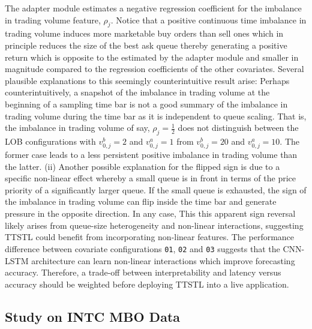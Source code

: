 \documentclass[10pt,a4paper,oneside]{article}
\providecommand{\DIFaddtex}[1]{{\protect\color{blue} \sf #1}} %
\providecommand{\DIFdeltex}[1]{{\protect\color{red} \scriptsize #1}} %
\providecommand{\DIFaddbegin}{} %
\providecommand{\DIFaddend}{} %
\providecommand{\DIFdelbegin}{} %
\providecommand{\DIFdelend}{} %
\providecommand{\DIFadd}[1]{\texorpdfstring{\DIFaddtex{#1}}{#1}} %
\providecommand{\DIFdel}[1]{\texorpdfstring{\DIFdeltex{#1}}{}} %
\newcommand{\DIFscaledelfig}{0.5}
\newlength{\DIFdelgraphicswidth} %
\newlength{\DIFdelgraphicsheight} %
\newcommand{\DIFaddincludegraphics}[2][]{{\color{blue}\fbox{\DIFOincludegraphics[#1]{#2}}}} %
\newcommand{\DIFdelincludegraphics}[2][]{%
\sbox{\DIFdelgraphicsbox}{\DIFOincludegraphics[#1]{#2}}%
\settoboxwidth{\DIFdelgraphicswidth}{\DIFdelgraphicsbox} %
\settoboxtotalheight{\DIFdelgraphicsheight}{\DIFdelgraphicsbox} %
\scalebox{\DIFscaledelfig}{%
\parbox[b]{\DIFdelgraphicswidth}{\usebox{\DIFdelgraphicsbox}\\[-\baselineskip] \rule{\DIFdelgraphicswidth}{0em}}\llap{\resizebox{\DIFdelgraphicswidth}{\DIFdelgraphicsheight}{%
\setlength{\unitlength}{\DIFdelgraphicswidth}%
\begin{picture}(1,1)%
\thicklines\linethickness{2pt} %
{\color[rgb]{1,0,0}\put(0,0){\framebox(1,1){}}}%
{\color[rgb]{1,0,0}\put(0,0){\line( 1,1){1}}}%
{\color[rgb]{1,0,0}\put(0,1){\line(1,-1){1}}}%
\end{picture}%
}\hspace*{3pt}}} %
} %
\DeclareRobustCommand{\DIFaddbegin}{\DIFOaddbegin \let\includegraphics\DIFaddincludegraphics} %
\DeclareRobustCommand{\DIFaddend}{\DIFOaddend \let\includegraphics\DIFOincludegraphics} %
\DeclareRobustCommand{\DIFdelbegin}{\DIFOdelbegin \let\includegraphics\DIFdelincludegraphics} %
\DeclareRobustCommand{\DIFdelend}{\DIFOaddend \let\includegraphics\DIFOincludegraphics} %
\begin{document}
The adapter module estimates a negative regression coefficient for the imbalance in trading volume feature, $\rho_j$. Notice that a positive continuous time imbalance in trading volume induces more marketable buy orders than sell ones which in principle reduces the size of the best ask queue thereby generating a positive return which is opposite to the estimated by the adapter module and smaller in magnitude compared to the regression coefficients of the other covariates. Several plausible explanations to this seemingly counterintuitive result arise: Perhaps counterintuitively, a snapshot of the imbalance in trading volume at the beginning of a sampling time bar is not a good summary of the imbalance in trading volume during the time bar as it is independent to queue scaling. That is, the imbalance in trading volume of say, $\rho_j = \frac{1}{2}$ does not distinguish between the LOB configurations with $v^b_{0,j} = 2$ and $v^a_{0, j} = 1$ from $v^b_{0,j} = 20$ and $v^a_{0, j} = 10$. The former case leads to a less persistent positive imbalance in trading volume than the latter. (ii) Another possible explanation for the flipped sign is due to a specific non-linear effect whereby a small queue is in front in terms of the price priority of a significantly larger queue. If the small queue is exhausted, the sign of the imbalance in trading volume can flip inside the time bar and generate pressure in the opposite direction. In any case, \DIFdelbegin \DIFdel{This }\DIFdelend \DIFaddbegin \DIFadd{this }\DIFaddend apparent sign reversal likely arises from queue-size heterogeneity and non-linear interactions, suggesting TTSTL could benefit from incorporating non-linear features. The performance difference between covariate configurations  \verb|01|, \verb|02| and \verb|03| suggests that the CNN-LSTM architecture can learn non-linear interactions which improve forecasting accuracy. Therefore, a trade-off between interpretability and latency versus accuracy should be weighted before deploying TTSTL into a live application.

\subsection{Study on INTC MBO Data}
\label{subsec:results_intc}
\end{document}
